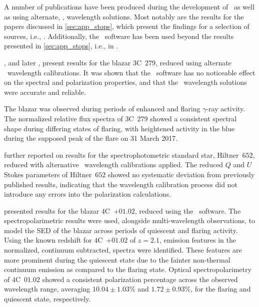 A number of publications have been produced during the development of \stops\ as well as using alternate, \iraf, wavelength solutions.
Most notably are the results for the papers discussed in \autoref{sec:app_stops}, which present the findings for a selection of sources, i.e., \citet{Buckley191221B, Cooper_HEASA2021, Cooper_HEASA2022, Schutte4C0102}.
Additionally, the \stops\ software has been used beyond the results presented in \autoref{sec:app_stops}, i.e., in \citet{Barnard_HEASA2021, Barnard_2024, Barnard_thesis}.


\citet{Cooper_HEASA2021}, and later \citet{Cooper_HEASA2022}, present results for the blazar $3$C~$279$, reduced using alternate \iraf\ wavelength calibrations.
It was shown that the \stops\ software has no noticeable effect on the spectral and polarization properties, and that the \iraf\ wavelength solutions were accurate and reliable.

The blazar was observed during periods of enhanced and flaring $\gamma$-ray activity.
The normalized relative flux spectra of $3$C~$279$ showed a consistent spectral shape during differing states of flaring, with heightened activity in the blue during the supposed peak of the flare on 31 March 2017.

\citet{Cooper_HEASA2022} further reported on results for the spectrophotometric standard star, Hiltner~$652$, reduced with alternative \iraf\ wavelength calibrations applied.
The reduced $Q$ and $U$ Stokes parameters of Hiltner~$652$ showed no systematic deviation from previously published results, indicating that the wavelength calibration process did not introduce any errors into the polarization calculations.

\citet{Schutte4C0102} presented results for the blazar $4$C~+$01.02$, reduced using the \stops\ software.
The spectropolarimetric results were used, alongside multi-wavelength observations, to model the \gls{SED} of the blazar across periods of quiescent and flaring activity.
Using the known redshift for $4$C~+$01.02$ of $z = 2.1$, emission features in the normalized, continuum subtracted, spectra were identified.
These features are more prominent during the quiescent state due to the fainter non-thermal continuum emission as compared to the flaring state.
Optical spectropolarimetry of $4$C~$01.02$ showed a consistent polarization percentage across the observed wavelength range, averaging $10.04 \pm 1.03 \%$ and $1.72 \pm 0.93 \%$, for the flaring and quiescent state, respectively.

